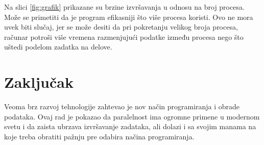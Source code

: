 \documentclass[a4paper]{article}
\begin{document}
    \par Na slici \ref{fig:grafik} prikazane su brzine izvršavanja u odnosu na broj procesa. Može se primetiti da je program efikasniji što više procesa koristi. Ovo ne mora uvek biti slučaj, jer se može desiti da pri pokretanju velikog broja procesa, računar potroši više vremena razmenjujući podatke između procesa nego što uštedi podelom zadatka na delove. 
	
	\section{Zaključak}
	\label{sec:zakljucak}
	Veoma brz razvoj tehnologije zahtevao je nov način programiranja i obrade podataka. Ovaj rad je pokazao da paralelnost ima ogromne primene u modernom svetu i da zaista ubrzava izvršavanje zadataka, ali dolazi i sa svojim manama na koje treba obratiti pažnju pre odabira načina programiranja.
	
	\appendix
	

	
\end{document}
